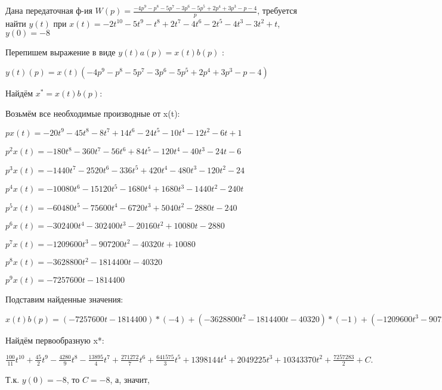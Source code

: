 \documentclass{article}
\begin{document}
{{{Дана передаточная ф-ия $W(p)=\frac{-4p^{9}-p^{8}-5p^{7}-3p^{6}-5p^{5}+2p^{4}+3p^{3}-p-4}{p}$, требуется найти $y(t)$ при $x(t)=-2t^{10}-5t^{9}-t^{8}+2t^{7}-4t^{6}-2t^{5}-4t^{3}-3t^{2}+t$, $y(0)=-8$

Перепишем выражение в виде $y(t)a(p)=x(t)b(p)$ :

$y(t)(p)=x(t)(-4p^{9}-p^{8}-5p^{7}-3p^{6}-5p^{5}+2p^{4}+3p^{3}-p-4)$

Найдём $x^*=x(t)b(p)$:

Возьмём все необходимые производные от x(t):

$px(t)=-20t^{9}-45t^{8}-8t^{7}+14t^{6}-24t^{5}-10t^{4}-12t^{2}-6t+1$

$p^2x(t)=-180t^{8}-360t^{7}-56t^{6}+84t^{5}-120t^{4}-40t^{3}-24t-6$

$p^3x(t)=-1440t^{7}-2520t^{6}-336t^{5}+420t^{4}-480t^{3}-120t^{2}-24$

$p^4x(t)=-10080t^{6}-15120t^{5}-1680t^{4}+1680t^{3}-1440t^{2}-240t$

$p^5x(t)=-60480t^{5}-75600t^{4}-6720t^{3}+5040t^{2}-2880t-240$

$p^6x(t)=-302400t^{4}-302400t^{3}-20160t^{2}+10080t-2880$

$p^7x(t)=-1209600t^{3}-907200t^{2}-40320t+10080$

$p^8x(t)=-3628800t^{2}-1814400t-40320$

$p^9x(t)=-7257600t-1814400$

Подставим найденные значения:

$x(t)b(p) = (-7257600t-1814400)*(-4)+(-3628800t^{2}-1814400t-40320)*(-1)+(-1209600t^{3}-907200t^{2}-40320t+10080)*(-5)+(-302400t^{4}-302400t^{3}-20160t^{2}+10080t-2880)*(-3)+(-60480t^{5}-75600t^{4}-6720t^{3}+5040t^{2}-2880t-240)*(-5)+(-10080t^{6}-15120t^{5}-1680t^{4}+1680t^{3}-1440t^{2}-240t)*2+(-1440t^{7}-2520t^{6}-336t^{5}+420t^{4}-480t^{3}-120t^{2}-24)*3+(-20t^{9}-45t^{8}-8t^{7}+14t^{6}-24t^{5}-10t^{4}-12t^{2}-6t+1)*(-1)+(-20t^{9}-45t^{8}-8t^{7}+14t^{6}-24t^{5}-10t^{4}-12t^{2}-6t+1)*(-4)=100t^{9}+225t^{8}-4280t^{7}-27790t^{6}+271272t^{5}+1283150t^{4}+6990720t^{3}+8196900t^{2}+31030110t$





Найдём первообразную x*:

$\frac{100}{11}t^{10}+\frac{45}{2}t^{9}-\frac{4280}{9}t^{8}-\frac{13895}{4}t^{7}+\frac{271272}{7}t^{6}+\frac{641575}{3}t^{5}+1398144t^{4}+2049225t^{3}+10343370t^{2}+\frac{7257283}{2}+C.$

Т.к. $y(0)=-8$, то $C=-8$, а, значит, 

}}}
\end{document}
